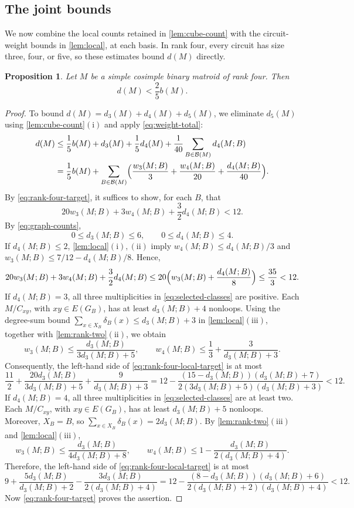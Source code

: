 \documentclass[11pt]{article}
\numberwithin{equation}{section}
\newtheorem{proposition}[proposition]{Proposition}
\newcommand{\BB}{\mathcal B}
\newcommand{\wloc}[1]{w_{#1}(M;B)}
\newcommand{\dloc}[1]{d_{#1}(M;B)}
\begin{document}
\subsection{The joint bounds}

We now combine the local counts retained in \autoref{lem:cube-count}
with the circuit-weight bounds in \autoref{lem:local}, at each basis.
In rank four, every circuit has size three, four, or five,
so these estimates bound \(d(M)\) directly.

\begin{proposition}\label{prop:rank-four}
Let \(M\) be a simple cosimple binary matroid of rank four. Then
\[
 d(M)<\frac25 b(M).
\]
\end{proposition}
\begin{proof}
To bound \(d(M)=d_3(M)+d_4(M)+d_5(M)\), we eliminate \(d_5(M)\)
using \autoref{lem:cube-count}\(\mathrm{(i)}\) and apply \eqref{eq:weight-total}:
\begin{align}
 d(M)&\le\frac15b(M)+d_3(M)+\frac15d_4(M)
       +\frac1{40}\sum_{B\in\BB(M)}\dloc4\notag\\
 &=\frac15b(M)+\sum_{B\in\BB(M)}
 \Bigl(\frac{\wloc3}3+\frac{\wloc4}{20}+\frac{\dloc4}{40}\Bigr).
 \label{eq:rank-four-target}
\end{align}
By \eqref{eq:rank-four-target}, it suffices to show, for each \(B\), that
\begin{equation}\label{eq:rank-four-local-target}
 20\wloc3+3\wloc4+\frac32\dloc4<12.
\end{equation}
By \eqref{eq:graph-counts},
\[
 0\le\dloc3\le6,\qquad 0\le\dloc4\le4.
\]
If \(\dloc4\le2\), \autoref{lem:local}\(\mathrm{(i),(ii)}\) imply
\(\wloc4\le\dloc4/3\) and
\(\wloc3\le7/12-\dloc4/8\). Hence,
\[
 20\wloc3+3\wloc4+\frac32\dloc4
 \le20\Bigl(\wloc3+\frac{\dloc4}8\Bigr)\le\frac{35}3<12.
\]
If \(\dloc4=3\), all three multiplicities in
\eqref{eq:selected-classes} are positive.
Each \(M/C_{xy}\), with \(xy\in E(G_B)\), has at least
\(\dloc3+4\) nonloops.
Using the degree-sum bound \(\sum_{x\in X_B}\delta_B(x)\le\dloc3+3\)
in \autoref{lem:local}\(\mathrm{(iii)}\), together with
\autoref{lem:rank-two}\(\mathrm{(ii)}\), we obtain
\[
 \wloc3\le\frac{\dloc3}{3\dloc3+5},\qquad
 \wloc4\le\frac13+\frac3{\dloc3+3}.
\]
Consequently, the left-hand side of \eqref{eq:rank-four-local-target}
is at most
\[
 \frac{11}2+\frac{20\dloc3}{3\dloc3+5}+\frac9{\dloc3+3}
 =12-\frac{(15-\dloc3)(\dloc3+7)}
 {2(3\dloc3+5)(\dloc3+3)}<12.
\]
If \(\dloc4=4\), all three multiplicities in
\eqref{eq:selected-classes} are at least two.
Each \(M/C_{xy}\), with \(xy\in E(G_B)\), has at least
\(\dloc3+5\) nonloops. Moreover,
\(X_B=B\), so \(\sum_{x\in X_B}\delta_B(x)=2\dloc3\).
By \autoref{lem:rank-two}\(\mathrm{(iii)}\) and
\autoref{lem:local}\(\mathrm{(iii)}\),
\[
 \wloc3\le\frac{\dloc3}{4\dloc3+8},\qquad
 \wloc4\le1-\frac{\dloc3}{2(\dloc3+4)}.
\]
Therefore, the left-hand side of \eqref{eq:rank-four-local-target} is at most
\[
 9+\frac{5\dloc3}{\dloc3+2}-\frac{3\dloc3}{2(\dloc3+4)}
 =12-\frac{(8-\dloc3)(\dloc3+6)}
 {2(\dloc3+2)(\dloc3+4)}<12.
\]
Now \eqref{eq:rank-four-target} proves the assertion.
\end{proof}
\end{document}
